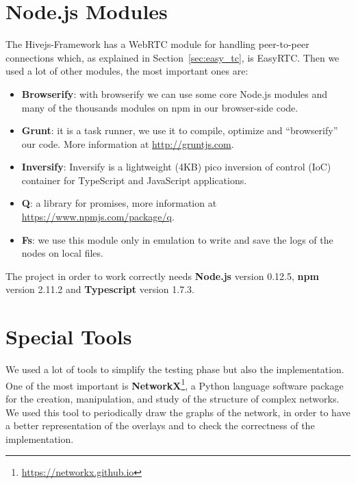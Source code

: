 \section{Node.js Modules}
\label{sec:modules}
The Hivejs-Framework has a WebRTC module for handling peer-to-peer connections which, as explained in Section~\ref{sec:easy_tc}, is EasyRTC. Then we used a lot of other modules, the most important ones are:

\begin{itemize}
	\item \textbf{Browserify}: with browserify we can use some core Node.js modules and many of the thousands modules on npm in our browser-side code.
	\item \textbf{Grunt}: it is a task runner, we use it to compile, optimize and ``browserify'' our code. More information at \url{http://gruntjs.com}.
	\item \textbf{Inversify}: Inversify is a lightweight (4KB) pico inversion of control (IoC) container for TypeScript and JavaScript applications.
	\item \textbf{Q}: a library for promises, more information at \url{https://www.npmjs.com/package/q}.
	\item \textbf{Fs}: we use this module only in emulation to write and save the logs of the nodes on local files.
\end{itemize}

The project in order to work correctly needs \textbf{Node.js} version 0.12.5, \textbf{npm} version 2.11.2 and \textbf{Typescript} version 1.7.3.

\section{Special Tools}
We used a lot of tools to simplify the testing phase but also the implementation. One of the most important is \textbf{NetworkX}\footnote{\url{https://networkx.github.io}}, a Python language software package for the creation, manipulation, and study of the structure of complex networks. We used this tool to periodically draw the graphs of the network, in order to have a better representation of the overlays and to check the correctness of the implementation. 


